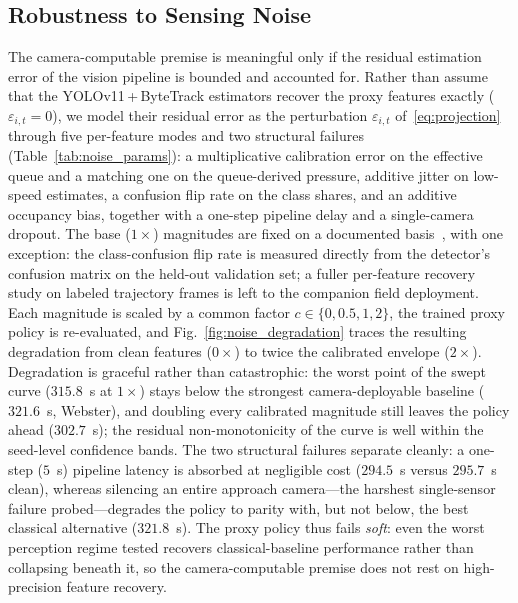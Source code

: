 \subsection{Robustness to Sensing Noise}
\label{sec:robustness_noise}
\label{sec:noise_model}
The camera-computable premise is meaningful only if the residual estimation error of the
vision pipeline is bounded and accounted for. Rather than assume that the
YOLOv11\,+\,ByteTrack estimators recover the proxy features exactly
($\varepsilon_{i,t} = 0$), we model their residual error as the perturbation
$\varepsilon_{i,t}$ of~\eqref{eq:projection} through five per-feature modes and two
structural failures (Table~\ref{tab:noise_params}): a multiplicative calibration error on
the effective queue and a matching one on the queue-derived pressure, additive jitter on
low-speed estimates, a confusion flip rate on the class shares, and an additive occupancy
bias, together with a one-step pipeline delay and a single-camera dropout. The base
($1\times$) magnitudes are fixed on a documented
basis~\cite{zhang2022_bytetrack,khanam2024_yolov11}, with one exception: the
class-confusion flip rate is measured directly from the detector's confusion matrix on
the held-out validation set; a fuller per-feature recovery study on labeled trajectory
frames is left to the companion field deployment. Each magnitude
is scaled by a common factor $c\in\{0,0.5,1,2\}$, the trained proxy policy is re-evaluated,
and Fig.~\ref{fig:noise_degradation} traces the
resulting degradation from clean features ($0\times$) to twice the calibrated envelope ($2\times$).
Degradation is graceful rather than catastrophic: the worst point of the swept curve
($315.8$~s at $1\times$) stays below the strongest camera-deployable baseline
($321.6$~s, Webster), and doubling every calibrated magnitude still leaves the policy
ahead ($302.7$~s); the residual non-monotonicity of the curve is well within the
seed-level confidence bands. The two structural failures separate cleanly: a one-step
($5$~s) pipeline latency is absorbed at negligible cost ($294.5$~s versus $295.7$~s
clean), whereas silencing an entire approach camera---the harshest single-sensor
failure probed---degrades the policy to parity with, but not below, the best classical
alternative ($321.8$~s). The proxy policy thus fails \emph{soft}: even the worst
perception regime tested recovers classical-baseline performance rather than collapsing
beneath it, so the camera-computable premise does not rest on high-precision feature
recovery.

